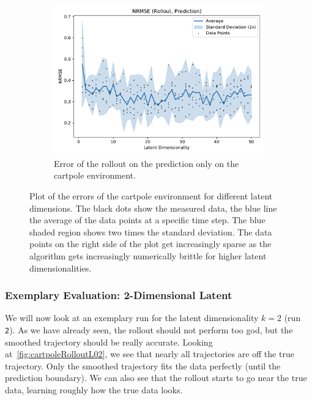 \begin{figure}
\begin{subfigure}{0.5\linewidth}
					\label{fig:cartpoleRmseTrain}
				\end{subfigure}%
				~
				\begin{subfigure}{0.5\linewidth}
					\centering
					\includegraphics[width=\linewidth]{figures/results/cartpole-gym/latent-dim/comparison-rmse-rollout-prediction-normalized-mean-vs-latent-dim.pdf}
					\caption{Error of the rollout on the prediction only on the cartpole environment.}
					\label{fig:cartpoleRmsePred}
				\end{subfigure}
				\caption{Plot of the errors of the cartpole environment for different latent dimensions. The black dots show the measured data, the blue line the average of the data points at a specific time step. The blue shaded region shows two times the standard deviation. The data points on the right side of the plot get increasingly sparse as the algorithm gets increasingly numerically brittle for higher latent dimensionalities.}
				\label{fig:cartpoleRmse}
			\end{figure}

		\subsubsection{Exemplary Evaluation: 2-Dimensional Latent}
			We will now look at an exemplary run for the latent dimensionality \( k = 2 \) (run \texttt{2}). As we have already seen, the rollout should not perform too god, but the smoothed trajectory should be really accurate. Looking at~\autoref{fig:cartpoleRolloutL02}, we see that nearly all trajectories are off the true trajectory. Only the smoothed trajectory fits the data perfectly (until the prediction boundary). We can also see that the rollout starts to go near the true data, learning roughly how the true data looks.

